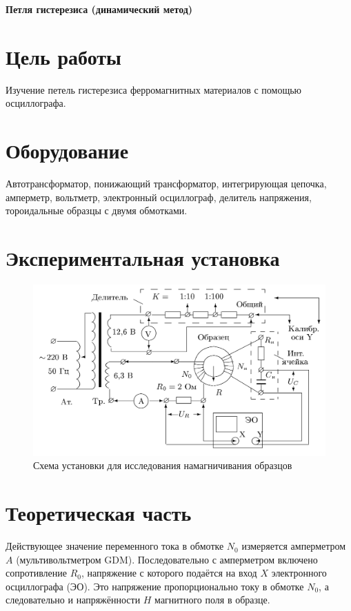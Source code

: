 \documentclass[a4paper, fontsize=14pt]{article}
\begin{document}



\huge
\centering
\textbf{Петля гистерезиса (динамический метод)}

\raggedright
\large
\parindent=1cm
\section*{Цель работы}
Изучение петель гистерезиса ферромагнитных материалов с помощью осциллографа.
\section*{Оборудование}
Автотрансформатор, понижающий трансформатор, интегрирующая цепочка, амперметр, вольтметр, электронный осциллограф, делитель напряжения, тороидальные образцы с двумя обмотками.
\section*{Экспериментальная установка}
\begin{figure}[H]
\center
\includegraphics[scale=0.2]{ust.png}
\caption{Схема установки для исследования намагничивания образцов}
\end{figure}

\section*{Теоретическая часть}
Действующее значение переменного тока в обмотке $N_0$ измеряется амперметром $A$ (мультивольтметром GDM). Последовательно с амперметром включено сопротивление $R_0$, напряжение с которого подаётся на вход $X$ электронного осциллографа (ЭО). Это напряжение пропорционально току в обмотке $N_0$, а следовательно и напряжённости $H$ магнитного поля в образце.
\end{document}
